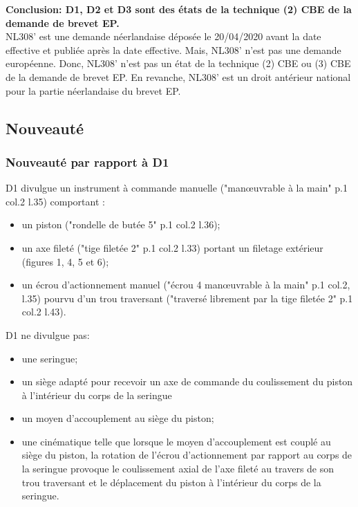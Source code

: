 \textbf{Conclusion: D1, D2 et D3 sont des états de la technique (2) CBE de la demande de brevet EP.}\\

NL308' est une demande néerlandaise déposée le 20/04/2020 avant la date effective et publiée après
la date effective. Mais, NL308' n'est pas une demande européenne.
Donc, NL308' n'est pas un état de la technique (2) CBE ou (3) CBE de la demande de brevet EP.
En revanche, NL308' est un droit antérieur national
pour la partie néerlandaise du brevet EP.

\newpage

\subsection{Nouveauté}

\subsubsection{Nouveauté par rapport à D1}

D1 divulgue un instrument à commande manuelle
("manœuvrable à la main" p.1 col.2 l.35) comportant :
\begin{itemize}
  \item un piston ("rondelle de butée 5" p.1 col.2 l.36);
  \item un axe fileté ("tige filetée 2" p.1 col.2 l.33)
  portant un filetage extérieur (figures 1, 4, 5 et 6);
  \item un écrou d'actionnement manuel ("écrou 4 manœuvrable à la main"
  p.1 col.2, l.35) pourvu d'un trou traversant ("traversé librement
  par la tige filetée 2" p.1 col.2 l.43).\\
\end{itemize}

D1 ne divulgue pas:
\begin{itemize}
  \item une seringue;
  \item un siège adapté pour recevoir un axe
  de commande du coulissement du piston à l'intérieur du corps de la seringue
  \item un moyen d'accouplement au siège du piston;
  \item une cinématique telle que lorsque le moyen d'accouplement est couplé au siège du piston, la 
  rotation de l'écrou d'actionnement par rapport au corps de la seringue provoque 
  le coulissement axial de l'axe fileté au travers de son trou traversant et le déplacement 
  du piston à l'intérieur du corps de la seringue.\\
\end{itemize}


